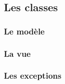\subsection{Les classes}

\subsubsection{Le modèle}

\subsubsection{La vue}

\subsubsection{Les exceptions}